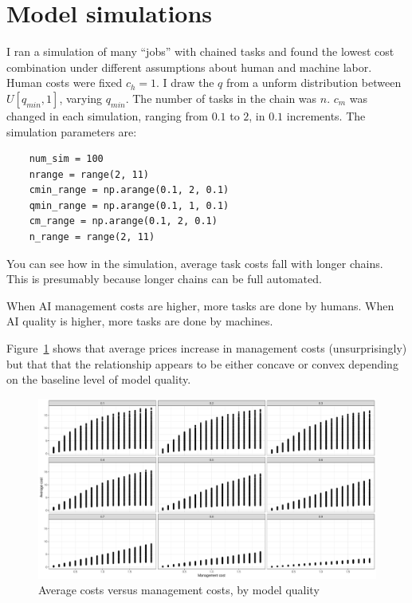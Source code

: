 \documentclass{article}
\begin{document}
\section{Model simulations}

I ran a simulation of many ``jobs'' with chained tasks and found
the lowest cost combination under different assumptions about human
and machine labor.
Human costs were fixed $c_h = 1$. 
I draw the $q$ from a unform distribution between $U[q_{min}, 1]$,
varying $q_{min}$.
The number of tasks in the chain was $n$.
$c_m$ was changed in each simulation, ranging from $0.1$ to $2$, in
$0.1$ increments.
The simulation parameters are: 

\begin{verbatim}
    num_sim = 100
    nrange = range(2, 11)
    cmin_range = np.arange(0.1, 2, 0.1)
    qmin_range = np.arange(0.1, 1, 0.1)
    cm_range = np.arange(0.1, 2, 0.1)
    n_range = range(2, 11)
\end{verbatim}

You can see how in the simulation, average task costs fall with longer chains.
This is presumably because longer chains can be full automated.

When AI management costs are higher, more tasks are done by humans.
When AI quality is higher, more tasks are done by machines.



Figure~\ref{fig:avg_cost_by_management_cost} shows that average prices increase in management costs (unsurprisingly) but that that the relationship appears to be either concave or convex depending on the baseline level of model quality.

\begin{figure}
\caption{Average costs versus management costs, by model quality} \label{fig:avg_cost_by_management_cost}
\includegraphics[width = \textwidth]{plots/avg_cost_by_management_cost.pdf}
\end{figure}
\end{document}

